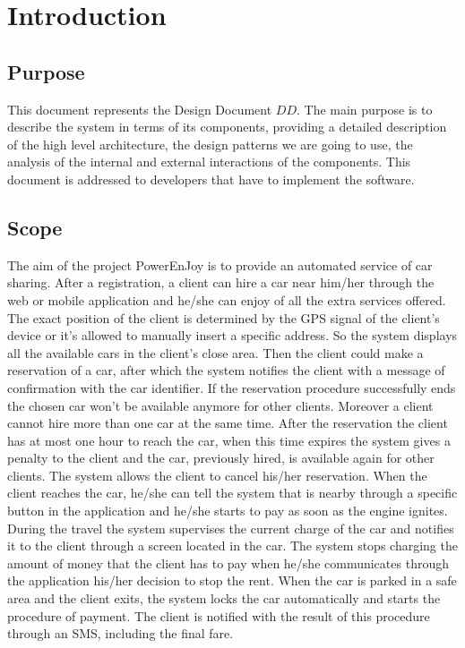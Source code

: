 \chapter{Introduction}

\section{Purpose}
This document represents the Design Document \(DD\).
The main purpose is to describe the system in terms of its components, providing a detailed description of the high level architecture, the design patterns we are going to use, the analysis of the internal and external interactions of the components.
This document is addressed to developers that have to implement the software.

\section{Scope}
The aim of the project PowerEnJoy is to provide an automated service of car sharing.
After a registration, a client can hire a car near him/her through the web or mobile application and he/she can enjoy of all the extra services offered.
The exact position of the client is determined by the GPS signal of the client’s device or it’s allowed to manually insert a specific address.
So the system displays all the available cars in the client’s close area.
Then the client could make a reservation of a car, after which the system notifies the client with a message of confirmation with the car identifier.
If the reservation procedure successfully ends the chosen car won’t be available anymore for other clients.
Moreover a client cannot hire more than one car at the same time.
After the reservation the client has at most one hour to reach the car, when this time expires the system gives a penalty to the client and the car, previously hired, is available again for other clients.
The system allows the client to cancel his/her reservation.
When the client reaches the car, he/she can tell the system that is nearby through a specific button in the application and he/she starts to pay as soon as the engine ignites.
During the travel the system supervises the current charge of the car and notifies it to the client through a screen located in the car.
The system stops charging the amount of money that the client has to pay when he/she communicates through the application his/her decision to stop the rent.
When the car is parked in a safe area and the client exits, the system locks the car automatically and starts the procedure of payment.
The client is notified with the result of this procedure through an SMS, including the final fare.

